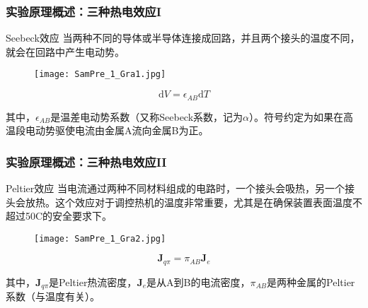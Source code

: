 \documentclass[aspectratio=169]{beamer}
\begin{document}
	\begin{frame}
		\frametitle{实验原理概述：三种热电效应I}
		
		\begin{block}{Seebeck效应}
			\small 当两种不同的导体或半导体连接成回路，并且两个接头的温度不同，就会在回路中产生\textcolor{c4}{电动势}。
			
			\begin{figure}[htbp]
				\centering
				\texttt{[image: SamPre\_1\_Gra1.jpg]}
			\end{figure}
			
			\begin{myhighlight}
				$$\mathrm{d}V=\epsilon_{AB}\mathrm{d}T$$
			\end{myhighlight}
			\footnotesize 其中，$\epsilon_{AB}$是温差电动势系数（又称\textcolor{c4}{Seebeck系数}，记为$\alpha$）。符号约定为如果在高温段电动势驱使电流由金属A流向金属B为正。			
		\end{block}
		
	\end{frame}
	
	\begin{frame}
		\frametitle{实验原理概述：三种热电效应II}
		
		\begin{block}{Peltier效应}
			\small 当电流通过两种不同材料组成的电路时，一个接头会吸热，另一个接头会放热。这个效应对于\textcolor{c4}{调控热机的温度}非常重要，尤其是在确保装置表面温度不超过50\degree C的安全要求下。
			
			\begin{figure}[htbp]
				\centering
				\texttt{[image: SamPre\_1\_Gra2.jpg]}
			\end{figure}
			
			\begin{myhighlight}
				$$\textbf{J}_{q\pi}=\pi_{AB}\textbf{J}_{e}$$
			\end{myhighlight}
			\footnotesize 其中，$\textbf{J}_{q\pi}$是Peltier热流密度，$\textbf{J}_{e}$是从A到B的电流密度，$\pi_{AB}$是两种金属的Peltier系数（与温度有关）。
		\end{block}
		
	\end{frame}
	
\end{document}
